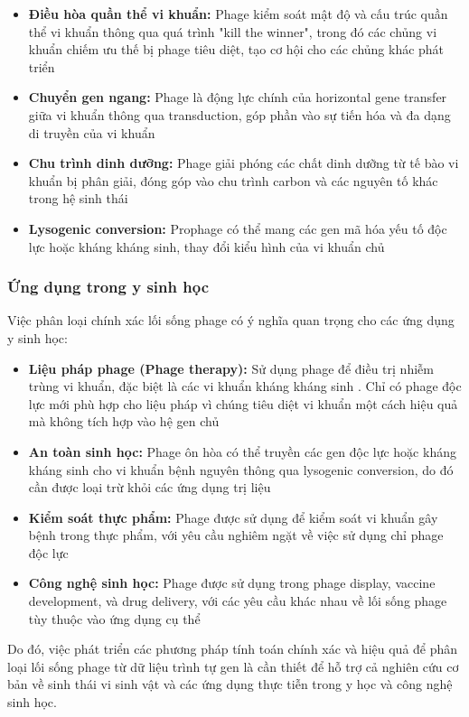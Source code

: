\begin{itemize}
    \item \textbf{Điều hòa quần thể vi khuẩn:} Phage kiểm soát mật độ và cấu trúc quần thể vi khuẩn thông qua quá trình "kill the winner", trong đó các chủng vi khuẩn chiếm ưu thế bị phage tiêu diệt, tạo cơ hội cho các chủng khác phát triển \cite{koskella2014bacteria}

    \item \textbf{Chuyển gen ngang:} Phage là động lực chính của horizontal gene transfer giữa vi khuẩn thông qua transduction, góp phần vào sự tiến hóa và đa dạng di truyền của vi khuẩn

    \item \textbf{Chu trình dinh dưỡng:} Phage giải phóng các chất dinh dưỡng từ tế bào vi khuẩn bị phân giải, đóng góp vào chu trình carbon và các nguyên tố khác trong hệ sinh thái

    \item \textbf{Lysogenic conversion:} Prophage có thể mang các gen mã hóa yếu tố độc lực hoặc kháng kháng sinh, thay đổi kiểu hình của vi khuẩn chủ
\end{itemize}

\subsubsection{Ứng dụng trong y sinh học}

Việc phân loại chính xác lối sống phage có ý nghĩa quan trọng cho các ứng dụng y sinh học:

\begin{itemize}
    \item \textbf{Liệu pháp phage (Phage therapy):} Sử dụng phage để điều trị nhiễm trùng vi khuẩn, đặc biệt là các vi khuẩn kháng kháng sinh \cite{gorski2016phage,azimi2019phage}. Chỉ có phage độc lực mới phù hợp cho liệu pháp vì chúng tiêu diệt vi khuẩn một cách hiệu quả mà không tích hợp vào hệ gen chủ

    \item \textbf{An toàn sinh học:} Phage ôn hòa có thể truyền các gen độc lực hoặc kháng kháng sinh cho vi khuẩn bệnh nguyên thông qua lysogenic conversion, do đó cần được loại trừ khỏi các ứng dụng trị liệu \cite{cobian2016viruses}

    \item \textbf{Kiểm soát thực phẩm:} Phage được sử dụng để kiểm soát vi khuẩn gây bệnh trong thực phẩm, với yêu cầu nghiêm ngặt về việc sử dụng chỉ phage độc lực

    \item \textbf{Công nghệ sinh học:} Phage được sử dụng trong phage display, vaccine development, và drug delivery, với các yêu cầu khác nhau về lối sống phage tùy thuộc vào ứng dụng cụ thể
\end{itemize}

Do đó, việc phát triển các phương pháp tính toán chính xác và hiệu quả để phân loại lối sống phage từ dữ liệu trình tự gen là cần thiết để hỗ trợ cả nghiên cứu cơ bản về sinh thái vi sinh vật và các ứng dụng thực tiễn trong y học và công nghệ sinh học.

